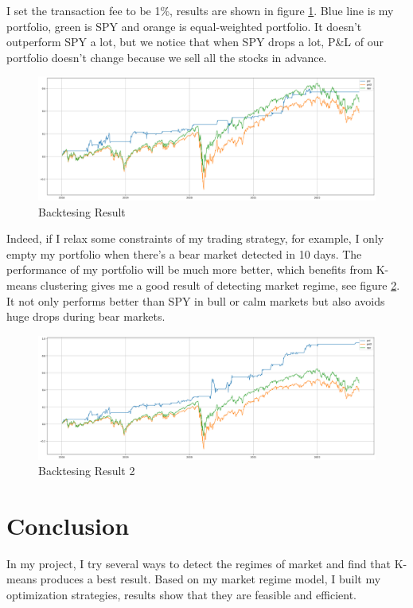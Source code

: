 \documentclass[a4paper,12pt]{article}
\begin{document}
I set the transaction fee to be 1\%, results are shown in figure \ref{backtest1}. Blue line is my portfolio, green is SPY and orange is equal-weighted portfolio. It doesn't outperform SPY a lot, but we notice that when SPY drops a lot, P\&L of our portfolio doesn't change because we sell all the stocks in advance.

\begin{figure}[H]
    \centering
    \includegraphics[scale=0.3]{backtest1.png}
    \caption{Backtesing Result}\label{backtest1}
\end{figure}

Indeed, if I relax some constraints of my trading strategy, for example, I only empty my portfolio when there's a bear market detected in 10 days. The performance of my portfolio will be much more better, which benefits from K-means clustering gives me a good result of detecting market regime, see figure \ref{backtest2}. It not only performs better than SPY in bull or calm markets but also avoids huge drops during bear markets.

\begin{figure}[H]
    \centering
    \includegraphics[scale=0.3]{backtest2.png}
    \caption{Backtesing Result 2}\label{backtest2}
\end{figure}

\section{Conclusion}

In my project, I try several ways to detect the regimes of market and find that K-means produces a best result. Based on my market regime model, I built my optimization strategies, results show that they are feasible and efficient.
\end{document}
